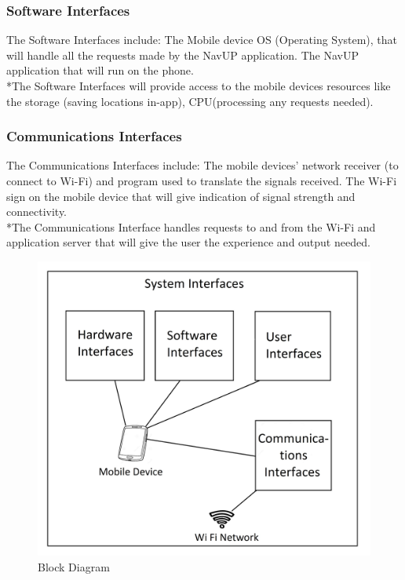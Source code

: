 \documentclass[11pt]{article}
\begin{document}
\subsubsection{Software Interfaces}
The Software Interfaces include:
The Mobile device OS (Operating System), that will handle all the requests made by the NavUP application.
The NavUP application that will run on the phone.\\
*The Software Interfaces will provide access to the mobile devices resources like the storage (saving locations in-app), CPU(processing any requests needed).

\subsubsection{Communications Interfaces}
The Communications Interfaces include:
The mobile devices’ network receiver (to connect to Wi-Fi) and program used to translate the signals received. 
The Wi-Fi sign on the mobile device that will give indication of signal strength and connectivity.\\
*The Communications Interface handles requests to and from the Wi-Fi and application server that will give the user the experience and output needed.


\begin{figure}[h!]
\centering
\includegraphics[scale=0.1]{BLockDiagram.jpg}
\caption{Block Diagram}
\label{fig:block diagram}
\end{figure}
\end{document}
